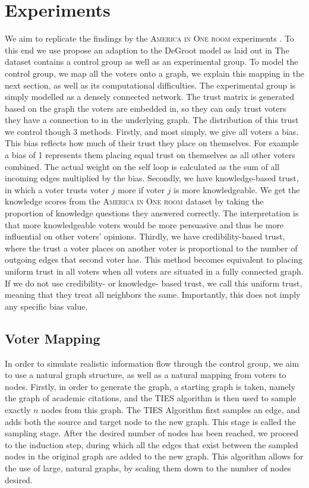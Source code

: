 \section{Experiments} We aim to replicate the findings by the \textsc{America
in One room} experiments \cite{fishkinCanDeliberationHave2024}. To this end we
use propose an adaption to the DeGroot model as laid out in
 The dataset contains a control group as well as an experimental
group. To model the control group, we map all the voters onto a graph, we
explain this mapping in the next section, as well as its computational
difficulties. The experimental group is simply modelled as a densely connected
network. The trust matrix is generated based on the graph the voters are
embedded in, so they can only trust voters they have a connection to in
the underlying graph. The distribution of this trust we control though 3
methods. Firstly, and most simply, we give all voters a bias. This bias
reflects how much of their trust they place on themselves. For example a bias
of 1 represents them placing equal trust on themselves as all other voters
combined. The actual weight on the self loop is calculated as the sum of all
incoming edges multiplied by the bias. Secondly, we have knowledge-based trust,
in which a voter trusts voter $j$ more if voter $j$ is more knowledgeable. We get
the knowledge scores from the \textsc{America in One room} dataset by taking the proportion of knowledge questions they answered correctly. The
interpretation is that more knowledgeable voters would be more persuasive and
thus be more influential on other voters' opinions. Thirdly, we have
credibility-based trust, where the trust a voter places on another voter is
proportional to the number of outgoing edges that second voter has. This method
becomes equivalent to placing uniform trust in all voters when all voters are
situated in a fully connected graph. If we do not use credibility- or knowledge-
based trust, we call this uniform trust, meaning that they treat all neighbors
the same. Importantly, this does not imply any specific bias value.

\subsection{Voter Mapping}
In order to simulate realistic information flow through the control group, we aim to use a natural graph structure, as well as a natural mapping from voters to nodes. Firstly, in order to generate the graph, a starting graph is taken, namely the graph of academic citations, and the TIES \cite{ahmedNetworkSamplingStatic2013} algorithm is then used to sample exactly $n$ nodes from this graph. The TIES Algorithm first samples an edge, and adds both the source and target node to the new graph. This stage is called the sampling stage. After the desired number of nodes has been reached, we proceed to the induction step, during which all the edges that exist between the sampled nodes in the original graph are added to the new graph. This algorithm allows for the use of large, natural graphs, by scaling them down to the number of nodes desired.

